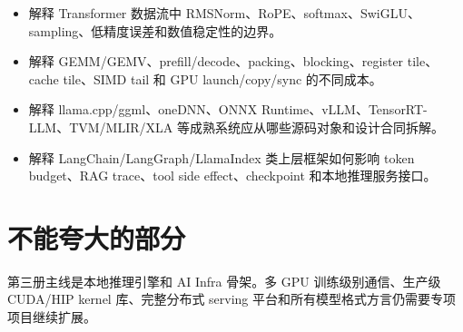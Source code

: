 \begin{itemize}
  \item 解释 Transformer 数据流中 RMSNorm、RoPE、softmax、SwiGLU、sampling、低精度误差和数值稳定性的边界。
  \item 解释 GEMM/GEMV、prefill/decode、packing、blocking、register tile、cache tile、SIMD tail 和 GPU launch/copy/sync 的不同成本。
  \item 解释 llama.cpp/ggml、oneDNN、ONNX Runtime、vLLM、TensorRT-LLM、TVM/MLIR/XLA 等成熟系统应从哪些源码对象和设计合同拆解。
  \item 解释 LangChain/LangGraph/LlamaIndex 类上层框架如何影响 token budget、RAG trace、tool side effect、checkpoint 和本地推理服务接口。
\end{itemize}

\section*{不能夸大的部分}

第三册主线是本地推理引擎和 AI Infra 骨架。多 GPU 训练级别通信、生产级 CUDA/HIP kernel 库、完整分布式 serving 平台和所有模型格式方言仍需要专项项目继续扩展。
